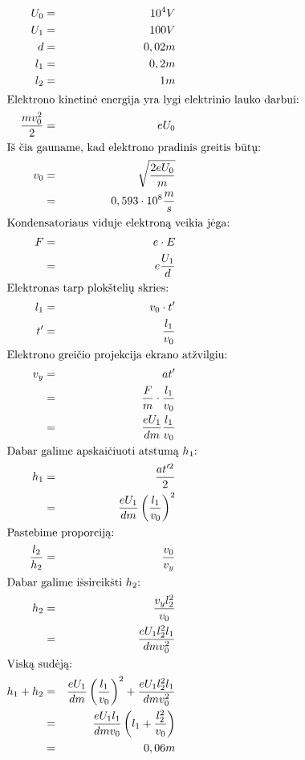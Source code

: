 \begin{align*}
  U_{0} &=& 10^{4} V \\ 
  U_{1} &=& 100 V \\
  d &=& 0,02 m \\
  l_{1} &=& 0,2 m \\
  l_{2} &=& 1m \\
  \intertext{Elektrono kinetinė energija yra lygi elektrinio lauko darbui:}
  \frac{m v_{0}^{2}}{2} &=& e U_{0} \\
  \intertext{Iš čia gauname, kad elektrono pradinis greitis būtų:}
  v_{0}
  &=& \sqrt{\frac{2 e U_{0}}{m}} \\
  &=& 0,593 \cdot 10^{8} \frac{m}{s} \\
  \intertext{Kondensatoriaus viduje elektroną veikia jėga:}
  F
  &=& e \cdot E \\
  &=& e \frac{U_{1}}{d} \\
  \intertext{Elektronas tarp plokštelių skries:}
  l_{1} &=& v_{0} \cdot t' \\
  t' &=& \frac{l_{1}}{v_{0}} \\
  \intertext{Elektrono greičio projekcija ekrano atžvilgiu:}
  v_{y}
  &=& a t' \\
  &=& \frac{F}{m} \cdot \frac{l_{1}}{v_{0}} \\
  &=& \frac{eU_{1}}{dm} \frac{l_{1}}{v_{0}} \\
  \intertext{Dabar galime apskaičiuoti atstumą $h_{1}$:}
  h_{1}
  &=& \frac{a t'^{2}}{2} \\
  &=& \frac{eU_{1}}{dm} \left( \frac{l_{1}}{v_{0}} \right)^{2} \\
  \intertext{Pastebime proporciją:}
  \frac{l_{2}}{h_{2}} &=& \frac{v_{0}}{v_{y}} \\
  \intertext{Dabar galime išsireikšti $h_{2}$:}
  h_{2}
  &=& \frac{v_{y} l_{2}^{2}}{v_{0}} \\
  &=& \frac{eU_{1} l_{2}^{2}l_{1}}{dmv_{0}^{2}} \\
  \intertext{Viską sudėją:}
  h_{1} + h_{2}
  &=& \frac{eU_{1}}{dm} \left( \frac{l_{1}}{v_{0}} \right)^{2} +
    \frac{eU_{1} l_{2}^{2}l_{1}}{dmv_{0}^{2}} \\
  &=& \frac{eU_{1}l_{1}}{dmv_{0}}
    \left( l_{1} + \frac{l_2^2}{v_{0}} \right) \\
  &=& 0,06 m
\end{align*}




